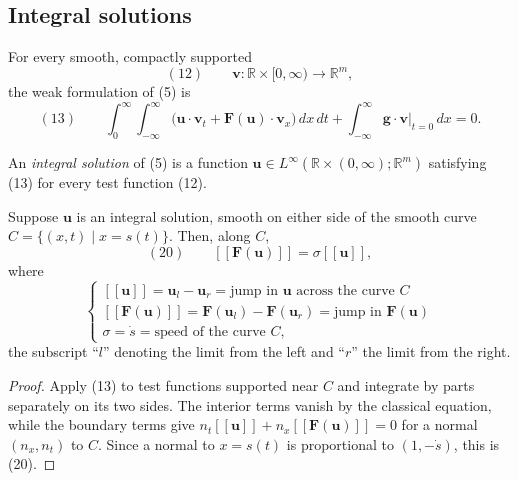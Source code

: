 \subsection{Integral solutions}\label{sec:integral-solutions-systems}

For every smooth, compactly supported
\[
(12)\qquad \mathbf v:\mathbb R\times[0,\infty)\to\mathbb R^m,
\]
the weak formulation of (5) is
\[
(13)\qquad
\int_0^\infty\!\int_{-\infty}^{\infty}
\bigl(\mathbf u\cdot\mathbf v_t+\mathbf F(\mathbf u)\cdot\mathbf v_x\bigr)\,dx\,dt
+\int_{-\infty}^{\infty}\mathbf g\cdot\mathbf v\big|_{t=0}\,dx=0.
\]

\begin{definition}
\label{def:integral-solution-system}

An \textit{integral solution} of (5) is a function
$\mathbf u\in L^\infty(\mathbb R\times(0,\infty);\mathbb R^m)$ satisfying (13) for every test function (12).
\end{definition}

\begin{proposition}
\label{prop:rankine-hugoniot-condition-system}

Suppose $\mathbf u$ is an integral solution, smooth on either side of the smooth curve
$C=\{(x,t)\mid x=s(t)\}$. Then, along $C$,
$$(20) \qquad [\![\mathbf{F}(\mathbf{u})]\!] = \sigma[\![\mathbf{u}]\!],$$
where
$$\begin{cases}
[\![\mathbf{u}]\!] = \mathbf{u}_l - \mathbf{u}_r = \text{jump in } \mathbf{u} \text{ across the curve } C \\
[\![\mathbf{F}(\mathbf{u})]\!] = \mathbf{F}(\mathbf{u}_l) - \mathbf{F}(\mathbf{u}_r) = \text{jump in } \mathbf{F}(\mathbf{u}) \\
\sigma = \dot{s} = \text{speed of the curve } C,
\end{cases}$$
the subscript ``$l$'' denoting the limit from the left and ``$r$'' the limit from the right.
\end{proposition}

\begin{proof}
\sketch Apply (13) to test functions supported near $C$ and integrate by parts separately on its two sides. The interior terms vanish by the classical equation, while the boundary terms give
$n_t[\![\mathbf u]\!]+n_x[\![\mathbf F(\mathbf u)]\!]=0$ for a normal $(n_x,n_t)$ to $C$. Since a normal to $x=s(t)$ is proportional to $(1,-\dot s)$, this is (20).
\end{proof}

